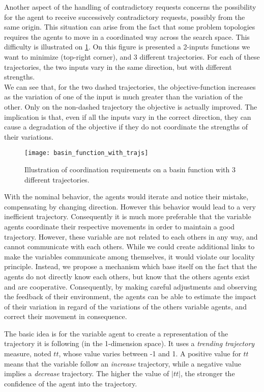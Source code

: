 Another aspect of the handling of contradictory requests concerns the possibility for the agent to receive successively contradictory requests, possibly from the same origin. This situation can arise from the fact that some problem topologies requires the agents to move in a coordinated way across the search space. This difficulty is illustrated on \figurename{} \ref{basin_fun_illustration}. On this figure is presented a 2-inputs functions we want to minimize (top-right corner), and 3 different trajectories. For each of these trajectories, the two inputs vary in the same direction, but with different strengths.\\
We can see that, for the two dashed trajectories, the objective-function increases as the variation of one of the input is much greater than the variation of the other. Only on the non-dashed trajectory the objective is actually improved. The implication is that, even if all the inputs vary in the correct direction, they can cause a degradation of the objective if they do not coordinate the strengths of their variations.

\begin{figure}
\centering
\texttt{[image: basin\_function\_with\_trajs]}
\caption{Illustration of coordination requirements on a basin function with 3 different trajectories.}\label{basin_fun_illustration}
\end{figure}

With the nominal behavior, the agents would iterate and notice their mistake, compensating by changing direction. However this behavior would lead to a very inefficient trajectory. Consequently it is much more preferable that the variable agents coordinate their respective movements in order to maintain a good trajectory. However, these variable are not related to each others in any way, and cannot communicate with each others. While we could create additional links to make the variables communicate among themselves, it would violate our locality principle. Instead, we propose a mechanism which base itself on the fact that the agents do not directly know each others, but know that the others agents exist and are cooperative. Consequently, by making careful adjustments and observing the feedback of their environment, the agents can be able to estimate the impact of their variation in regard of the variations of the others variable agents, and correct their movement in consequence.

The basic idea is for the variable agent to create a representation of the trajectory it is following (in the 1-dimension space). It uses a \emph{trending trajectory} measure, noted $tt$, whose value varies between -1 and 1. A positive value for $tt$ means that the variable follow an \emph{increase} trajectory, while a negative value implies a \emph{decrease} trajectory. The higher the value of $|tt|$, the stronger the confidence of the agent into the trajectory.

